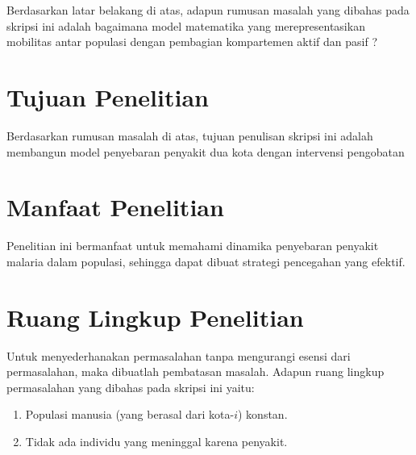 Berdasarkan latar belakang di atas, adapun rumusan masalah yang dibahas pada skripsi ini adalah bagaimana model matematika yang merepresentasikan mobilitas antar populasi dengan pembagian kompartemen aktif dan pasif ?



\section{\normalsize Tujuan Penelitian}
Berdasarkan rumusan masalah di atas, tujuan penulisan skripsi ini adalah membangun model penyebaran penyakit dua kota dengan intervensi pengobatan


\section{\normalsize Manfaat Penelitian}
Penelitian ini bermanfaat untuk memahami dinamika penyebaran penyakit malaria dalam populasi, sehingga dapat dibuat strategi pencegahan yang efektif.

\section{\normalsize Ruang Lingkup Penelitian}
Untuk menyederhanakan permasalahan tanpa mengurangi esensi dari permasalahan, maka dibuatlah pembatasan masalah. Adapun ruang lingkup permasalahan yang dibahas pada skripsi ini yaitu:
\begin{enumerate}
	\item Populasi manusia (yang berasal dari kota-$i$) konstan.
	\item Tidak ada individu yang meninggal karena penyakit. 
\end{enumerate}
